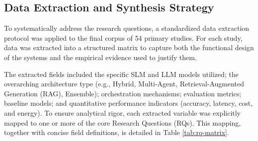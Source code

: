 \subsection{Data Extraction and Synthesis Strategy}
\label{sec:data_extraction}

To systematically address the research questions, a standardized data extraction protocol was applied to the final corpus of 54 primary studies. For each study, data was extracted into a structured matrix to capture both the functional design of the systems and the empirical evidence used to justify them. 

The extracted fields included the specific SLM and LLM models utilized; the overarching architecture type (e.g., Hybrid, Multi-Agent, Retrieval-Augmented Generation (RAG), Ensemble); orchestration mechanisms; evaluation metrics; baseline models; and quantitative performance indicators (accuracy, latency, cost, and energy). To ensure analytical rigor, each extracted variable was explicitly mapped to one or more of the core Research Questions (RQs). This mapping, together with concise field definitions, is detailed in Table \ref{tab:rq-matrix}.

